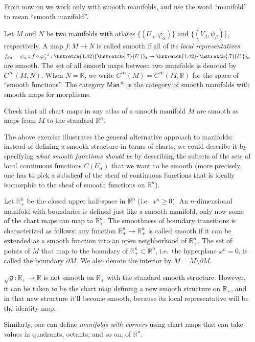 \documentclass[english,letterpaper]{article}%
\numberwithin{equation}{section}
\numberwithin{figure}{section}
\numberwithin{table}{section}
\theoremstyle{definition}
\theoremstyle{definition}
\theoremstyle{definition}
\theoremstyle{plain}
\theoremstyle{plain}
\theoremstyle{plain}
\theoremstyle{plain}
\theoremstyle{remark}
\theoremstyle{remark}
\renewcommand{\geq}{\geqslant}
\newcommand\wh[1]{\hstretch{1.42}{\hat{\hstretch{.7}{#1\mkern2mu}}}\mkern-2mu} %
\begin{document}
From now on we work only with smooth manifolds, and use the word ``manifold''  to mean ``smooth manifold''.
\begin{defn}
Let $M$ and $N$ be two manifolds with atlases $\{(U_\alpha,\varphi_\alpha)\}$ and $\{(V_\beta,\psi_\beta)\}$, respectively. A map $f:M\to N$ is called smooth if all of its \emph{local representatives} $f_{\beta\alpha}=\psi_\alpha\circ f\circ \varphi_\beta^{-1}:\wh{U}_\beta\to \wh{U}_\alpha$ are smooth. The set of all smooth maps between two manifolds is denoted by $C^\infty (M,N)$. When $N=\mathbb{R}$, we write $C^\infty(M)=C^\infty (M,\mathbb{R})$ for the space of ``smooth functions''. The category $\mathsf{Man}^\infty$ is the category of smooth manifolds with smooth maps for morphisms.
\end{defn}
\begin{xca}
Check that all chart maps in any atlas of a smooth manifold $M$ are smooth as maps from $M$ to the standard $\mathbb{R}^n$.
\end{xca}
\begin{rem}
The above exercise illustrates the general alternative approach to manifolds: instead of defining a smooth structure in terms of charts, we could describe it by specifying \emph{what smooth functions should be} by describing the subsets of the sets of local continuous functions $C(U_\alpha)$ that we want to be smooth (more precisely, one has to pick a subsheaf of the sheaf of continuous functions that is locally isomorphic to the sheaf of smooth functions on $\mathbb{R}^n$).
\end{rem}
\begin{defn}
Let $\mathbb{R}_+^n$ be the closed upper half-space in $\mathbb{R}^n$ (i.e.\ $x^n\geq 0$). An $n$-dimensional manifold with boundaries is defined just like a smooth manifold, only now some of the chart maps can map to $\mathbb{R}_+^n$. The smoothness of boundary transitions is characterized as follows: any function $\mathbb{R}_+^n\to \mathbb{R}_+^n$ is called smooth if it can be extended as a smooth function into an open neighborhood of $\mathbb{R}_+^n$. The set of points of $M$ that map to the boundary of $\mathbb{R}_+^n\subset \mathbb{R}^n$, i.e.\ the hyperplane $x^n=0$, is called the boundary $\partial M$. We also denote the interior by $\mathring M=M\setminus \partial M$.
\end{defn}
\begin{example}
$\sqrt{y}:\mathbb{R}_+\to\mathbb{R}$ is not smooth on $\mathbb{R}_+$ with the standard smooth structure. However, it can be taken to be the chart map defining a new smooth structure on $\mathbb{R}_+$, and in that new structure it'll become smooth, because its local representative will be the identity map.
\end{example}
\begin{rem}
Similarly, one can define \emph{manifolds with corners} using chart maps that can take values in quadrants, octants, and so on, of $\mathbb{R}^n$.
\end{rem}
\end{document}
